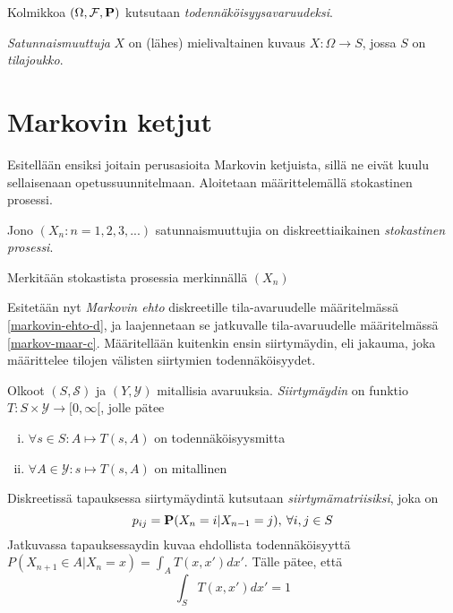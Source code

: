 \begin{maar}
	Kolmikkoa $(\Omega, \mathcal{F}, \textbf{P} )$ kutsutaan \textit{todennäköisyysavaruudeksi}.
\end{maar}

\begin{maar}
	\textit{Satunnaismuuttuja} $X$ on (lähes) mielivaltainen kuvaus $X:\Omega\rightarrow S$, jossa $S$ on \textit{tilajoukko}. 
\end{maar}



\section{Markovin ketjut}

Esitellään ensiksi joitain perusasioita Markovin ketjuista, sillä ne eivät kuulu sellaisenaan opetussuunnitelmaan. Aloitetaan määrittelemällä stokastinen prosessi.\cite{piiroinen_stokastiset_nodate}

\begin{maar}
	Jono $(X_n:n=1,2,3,...)$ satunnaismuuttujia on diskreettiaikainen \textit{stokastinen prosessi}.
\end{maar}

\begin{merk}
	Merkitään stokastista prosessia merkinnällä $( X_n )$
\end{merk}

Esitetään nyt \textit{Markovin ehto} diskreetille tila-avaruudelle määritelmässä \ref{markovin-ehto-d}, ja laajennetaan se jatkuvalle tila-avaruudelle määritelmässä \ref{markov-maar-c}. \cite{monte_carlo_book} Määritellään kuitenkin ensin siirtymäydin, eli jakauma, joka määrittelee tilojen välisten siirtymien todennäköisyydet.  \cite[s.~180]{klenke2013probability}

\begin{maar}
	Olkoot $(S,\mathcal{S})$ ja $(Y, \mathcal{Y})$ mitallisia avaruuksia. \emph{Siirtymäydin} on funktio $T:S\times \mathcal{Y} \rightarrow [0, \infty[$, jolle pätee
	\begin{enumerate}[(i)]
		\item $\forall s \in S: A \mapsto T(s,A)$ on todennäköisyysmitta
		\item $\forall A \in \mathcal{Y}: s \mapsto T(s,A)$ on mitallinen
	\end{enumerate}
	Diskreetissä tapauksessa siirtymäydintä kutsutaan \textit{siirtymämatriisiksi}, joka on 
	\begin{equation}
		p_{ij} = \textbf{P}(X_n = i | X_{n-1} = j), \:\forall i,j \in S
	\end{equation}
	Jatkuvassa tapauksessaydin kuvaa ehdollista todennäköisyyttä $P(X_{n+1} \in A|X_n = x) = \int_A T(x,x')dx'$. Tälle pätee, että 
	\begin{equation}\label{siirt-tiheys}
		\int_S T(x,x')dx' = 1
	\end{equation}
\end{maar}

